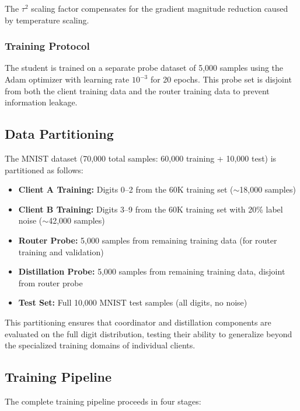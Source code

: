 The $\tau^2$ scaling factor compensates for the gradient magnitude reduction caused by temperature scaling.

\subsubsection{Training Protocol}

The student is trained on a separate probe dataset of 5,000 samples using the Adam optimizer with learning rate $10^{-3}$ for 20 epochs. This probe set is disjoint from both the client training data and the router training data to prevent information leakage.

\subsection{Data Partitioning}
\label{subsec:data_partitioning}

The MNIST dataset (70,000 total samples: 60,000 training + 10,000 test) is partitioned as follows:

\begin{itemize}
    \item \textbf{Client A Training:} Digits 0--2 from the 60K training set ($\sim$18,000 samples)
    \item \textbf{Client B Training:} Digits 3--9 from the 60K training set with 20\% label noise ($\sim$42,000 samples)
    \item \textbf{Router Probe:} 5,000 samples from remaining training data (for router training and validation)
    \item \textbf{Distillation Probe:} 5,000 samples from remaining training data, disjoint from router probe
    \item \textbf{Test Set:} Full 10,000 MNIST test samples (all digits, no noise)
\end{itemize}

This partitioning ensures that coordinator and distillation components are evaluated on the full digit distribution, testing their ability to generalize beyond the specialized training domains of individual clients.

\subsection{Training Pipeline}
\label{subsec:training_pipeline}

The complete training pipeline proceeds in four stages:

